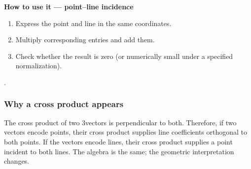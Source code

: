 \documentclass[letterpaper,11pt,english,openany,oneside]{jupyterBook}
\begin{document}
\begin{TextbookBox}
\textbf{How to use it — point–line incidence}\par\smallskip
\begin{enumerate}
%
\item {}
\sphinxAtStartPar
Express the point and line in the same coordinates.

\item {}
\sphinxAtStartPar
Multiply corresponding entries and add them.

\item {}
\sphinxAtStartPar
Check whether the result is zero (or numerically small under a specified normalization).

\end{enumerate}

\sphinxAtStartPar
{} {\hyperref[\detokenize{lectures/lecture01/projective:ex-lec01-intersections}]{}}.

\end{TextbookBox}


\subsubsection{Why a cross product appears}
\label{\detokenize{lectures/lecture01/projective:why-a-cross-product-appears}}
\sphinxAtStartPar
The cross product of two 3\sphinxhyphen{}vectors is perpendicular to both. Therefore, if two vectors encode points, their cross product supplies line coefficients orthogonal to both points. If the vectors encode lines, their cross product supplies a point incident to both lines. The algebra is the same; the geometric interpretation changes.
\end{document}

